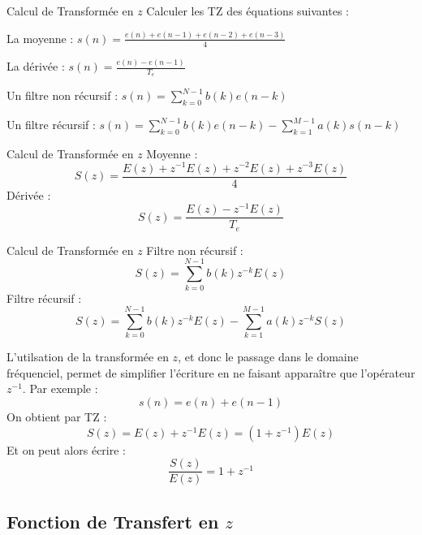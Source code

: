 \documentclass{beamer}
\begin{document}
\begin{frame}
\begin{exampleblock}{Calcul de Transformée en $z$}
	\justifying
	Calculer les TZ des équations suivantes :
	\itemize
	\item La moyenne : $s(n) = \frac{e(n) + e(n-1) + e(n-2) + e(n-3)}{4}$
	\item La dérivée : $s(n) = \frac{e(n) - e(n-1)}{T_e}$
	\item Un filtre non récursif : $s(n)=\sum_{k=0}^{N-1}b(k)e(n-k)$
	\item Un filtre récursif : $s(n)=\sum_{k=0}^{N-1}b(k)e(n-k) -
	\sum_{k=1}^{M-1}a(k)s(n-k)$
\end{exampleblock}
\end{frame}

\begin{frame}
\begin{exampleblock}{Calcul de Transformée en $z$}
Moyenne :
$$
S(z)=\frac{E(z)+z^{-1}E(z)+z^{-2}E(z)+z^{-3}E(z)}{4}
$$
\pause
Dérivée :
$$
S(z)=\frac{E(z)-z^{-1}E(z)}{T_e}
$$
\end{exampleblock}
\end{frame}

\begin{frame}
\begin{exampleblock}{Calcul de Transformée en $z$}
Filtre non récursif :
$$
S(z)=\sum_{k=0}^{N-1}b(k)z^{-k}E(z)
$$
\pause
Filtre récursif :
$$
S(z)=\sum_{k=0}^{N-1}b(k)z^{-k}E(z) - \sum_{k=1}^{M-1}a(k)z^{-k}S(z)
$$
\end{exampleblock}
\end{frame}


\begin{frame}
\justify
L'utilsation de la transformée en $z$, et donc le passage dans le domaine
fréquenciel, permet de simplifier l'écriture en ne faisant apparaître que
l'opérateur $z^{-1}$. Par exemple :
$$
s(n) = e(n) + e(n-1)
$$
On obtient par TZ :
$$
S(z) = E(z) + z^{-1}E(z) = (1+z^{-1})E(z)
$$
Et on peut alors écrire :
$$
\frac{S(z)}{E(z)} = 1+ z^{-1}
$$
\end{frame}

\subsection{Fonction de Transfert en $z$}
\end{document}
